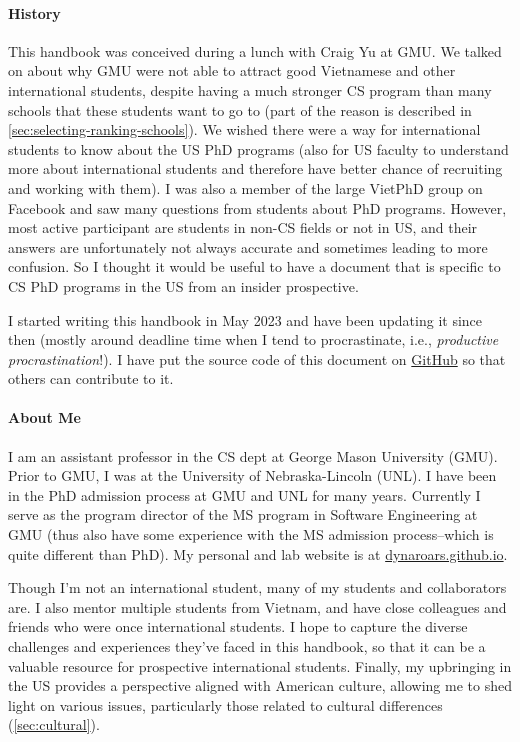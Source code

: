 \documentclass[oneside,11pt]{memoir}
\begin{document}
\paragraph{History} This handbook was conceived during a lunch with Craig Yu at GMU.  We talked on about why GMU were not able to attract good Vietnamese and other international students, despite having a much stronger CS program than many schools that these students want to go to (part of the reason is described in \autoref{sec:selecting-ranking-schools}). We wished there were a way for international students to know about the US PhD programs (also for US faculty to understand more about international students and therefore have better chance of recruiting and working with them). I was also a member of the large VietPhD group on Facebook and saw many questions from students about PhD programs.  However, most active participant are students in non-CS fields or not in US, and their answers are unfortunately not always accurate and sometimes leading to more confusion. So I thought it would be useful to have a document that is specific to CS PhD programs in the US from an insider prospective.

I started writing this handbook in May 2023 and have been updating it since then (mostly around deadline time when I tend to procrastinate, i.e., \emph{productive procrastination}!). I have put the source code of this document on \href{https://github.com/nguyenthanhvuh/phd-cs-us}{GitHub} so that others can contribute to it.

\paragraph{About Me} I am an assistant professor in the CS dept at George Mason University (GMU). Prior to GMU, I was at the University of Nebraska-Lincoln (UNL). I have been in the PhD admission process at GMU and UNL for many years.  Currently I serve as the program director of the MS program in Software Engineering at GMU (thus also have some experience with the MS admission process--which is quite different than PhD). My personal and lab website is at \href{https://dynaroars.github.io}{dynaroars.github.io}.

Though I'm not an international student, many of my students and collaborators are. I also mentor multiple students from Vietnam, and have close colleagues and friends who were once international students. I hope to capture the diverse challenges and experiences they've faced in this handbook, so that it  can be a valuable resource for prospective international students.
Finally, my upbringing in the US provides a perspective aligned with American culture, allowing me to shed light on various issues, particularly those related to cultural differences (\autoref{sec:cultural}).
\end{document}

